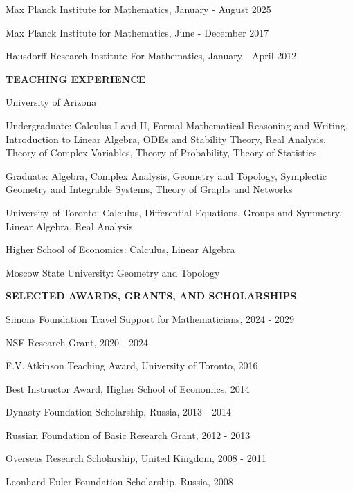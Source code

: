 \documentclass[a4paper, 12pt]{article}
\begin{document}
\begin{compactitem}
 \item Max Planck Institute for Mathematics, January - August 2025
 \item Max Planck Institute for Mathematics, June - December 2017
\item Hausdorff Research Institute For Mathematics, January - April 2012 %
\end{compactitem}
\par\quad\par\smallskip
\textbf{TEACHING EXPERIENCE}\par\smallskip
\begin{compactitem}
\item University of Arizona \begin{compactitem} \item Undergraduate: Calculus I and II, Formal Mathematical Reasoning and Writing,  Introduction to Linear Algebra, ODEs and Stability Theory, Real Analysis, Theory of Complex Variables, Theory of Probability, Theory of Statistics \item Graduate: Algebra, Complex Analysis, Geometry and Topology, Symplectic Geometry and Integrable Systems, Theory of Graphs and Networks\end{compactitem}
\item University of Toronto: Calculus, Differential Equations, Groups and Symmetry, Linear Algebra, Real Analysis
\item Higher School of Economics: Calculus, Linear Algebra
\item Moscow State University: Geometry and Topology
\end{compactitem}
\par\quad\par\smallskip
\textbf{SELECTED AWARDS, GRANTS, AND SCHOLARSHIPS}\par\smallskip
\begin{compactitem}
\item Simons Foundation Travel Support for Mathematicians, 2024 - 2029
\item NSF Research Grant, 2020 - 2024
\item  F.V.\,Atkinson Teaching Award, University of Toronto, 2016
\item Best Instructor Award, Higher School of Economics, 2014
\item Dynasty Foundation Scholarship, Russia, 2013 - 2014 
\item Russian Foundation of Basic Research Grant, 2012 - 2013 
\item  {{Overseas Research Scholarship}}, United Kingdom, 2008 - 2011
\item  {{Leonhard Euler Foundation}} Scholarship, Russia, 2008
\end{compactitem}
\par\quad\par\smallskip 
\end{document}
